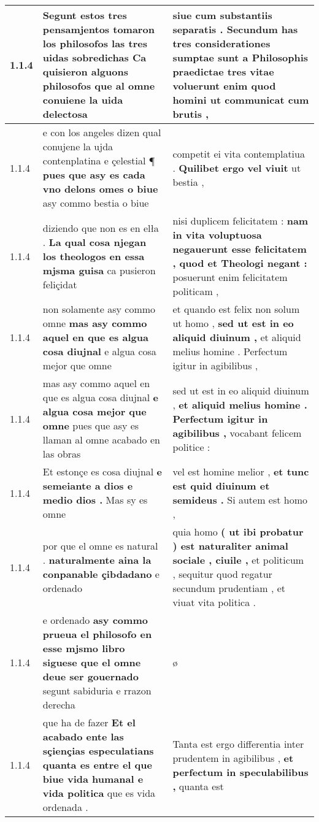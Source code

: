 \begin{tabular}{|p{1cm}|p{6.5cm}|p{6.5cm}|}
1.1.4 & Segunt estos tres pensamjentos tomaron los philosofos las tres uidas sobredichas \textbf{ Ca quisieron alguons philosofos } que al omne conuiene la uida delectosa & siue cum substantiis separatis . \textbf{ Secundum has tres considerationes sumptae sunt a Philosophis praedictae tres vitae voluerunt enim } quod homini ut communicat cum brutis , \\\hline
1.1.4 & e con los angeles dizen qual conujene la ujda contenplatina e çelestial ¶ \textbf{ pues que asy es cada vno delons omes o biue } asy commo bestia o biue & competit ei vita contemplatiua . \textbf{ Quilibet ergo vel viuit } ut bestia , \\\hline
1.1.4 & diziendo que non es en elła . \textbf{ La qual cosa njegan los theologos en essa mjsma guisa } ca pusieron feliçidat & nisi duplicem felicitatem : \textbf{ nam in vita voluptuosa negauerunt esse felicitatem , quod et Theologi negant : } posuerunt enim felicitatem politicam , \\\hline
1.1.4 & non solamente asy commo omne \textbf{ mas asy commo aquel en que es algua cosa diujnal } e algua cosa mejor que omne & et quando est felix non solum ut homo , \textbf{ sed ut est in eo aliquid diuinum , } et aliquid melius homine . Perfectum igitur in agibilibus , \\\hline
1.1.4 & mas asy commo aquel en que es algua cosa diujnal \textbf{ e algua cosa mejor que omne } pues que asy es llaman al omne acabado en las obras & sed ut est in eo aliquid diuinum , \textbf{ et aliquid melius homine . Perfectum igitur in agibilibus , } vocabant felicem politice : \\\hline
1.1.4 & Et estonçe es cosa diujnal \textbf{ e semeiante a dios e medio dios . } Mas sy es omne & vel est homine melior , \textbf{ et tunc est quid diuinum et semideus . } Si autem est homo , \\\hline
1.1.4 & por que el omne es natural . \textbf{ naturalmente aina la conpanable çibdadano } e ordenado & quia homo \textbf{ ( ut ibi probatur ) est naturaliter animal sociale , ciuile , } et politicum , sequitur quod regatur secundum prudentiam , et viuat vita politica . \\\hline
1.1.4 & e ordenado \textbf{ asy commo prueua el philosofo en esse mjsmo libro siguese que el omne deue ser gouernado } segunt sabiduria e rrazon derecha & ø \\\hline
1.1.4 & que ha de fazer \textbf{ Et el acabado ente las sçiençias especulatians quanta es entre el que biue vida humanal e vida politica } que es vida ordenada . & Tanta est ergo differentia inter prudentem in agibilibus , \textbf{ et perfectum in speculabilibus , } quanta est \\\hline

\end{tabular}
